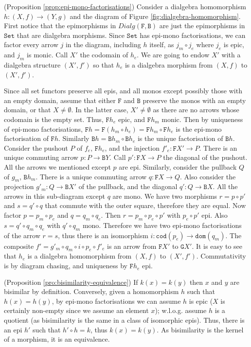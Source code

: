 \documentclass[orivec]{llncs}
\newcommand{\mC}[1]{\mathtt{#1}}
\newcommand{\mF}[1]{\mathtt{#1}}
\newcommand{\Set}{\mC{Set}}
\newcommand{\F}{\mF{F}}
\newcommand{\G}{\mF{G}}
\newcommand{\B}{\mF{B}}
\newcommand{\cod}{\mF{cod}}
\newcommand{\dom}{\mF{dom}}
\newcommand{\dialg}{\mathit{Dialg}}
\newcommand{\proend}{\medskip}
\renewenvironment{proof}{\begin{pro}}{\proend\end{pro}}
\begin{document}
\begin{proof}(Proposition \ref{prop:epi-mono-factorisations})
	Consider a dialgebra homomorphism $h  : (X,f) \to (Y,g)$ and the diagram of Figure \ref{fig:dialgebra-homomorphism}. First notice that the epimorphisms in $\dialg(\F,\B)$ are just the epimorphisms in $\Set$ that are dialgebra morphisms.
	Since $\Set$ has epi-mono factorisations, we can factor every arrow $j$ in the diagram, including $h$ itself, as $j_m \circ j_e$ where $j_e$ is epic, and $j_m$ is monic. Call $X'$ the codomain of $h_e$. We are going to endow $X'$ with a dialgebra structure $(X',f')$ so that $h_e$ is a dialgebra morphism from $(X,f)$ to $(X',f')$. 
	
	Since all set functors preserve all epis, and all monos except possibly those with an empty domain, assume that either $\F$ and $\B$ preserve the monos with an empty domain, or that $X \neq \emptyset$. In the latter case, $X' \neq \emptyset$ as there are no arrows whose codomain is the empty set. Thus, $\F h_e$ epic, and $\F h_m$ monic. Then by uniqueness of epi-mono factorisations, $\F h = \F (h_m \circ h_e) = \F h_m \circ \F h_e$ is the epi-mono factorisation of $\F h$. Similarly $\B h = \B h_m \circ \B h_e$ is the unique factorisation of $\B h$. Consider the pushout $P$ of $f_e$, $\F h_e$, and the injection $f'_e : \F X' \to P$. There is an unique commuting arrow $p : P \to \B Y$. Call $p' : \F X \to P$ the diagonal of the pushout. All the arrows we mentioned except $p$ are epi. Similarly, consider the pullback $Q$ of $g_m$, $\B h_m$. There is a unique commuting arrow $q : \F X \to Q$. Also consider the projection $g'_m : Q \to \B X'$ of the pullback, and the diagonal $q' : Q \to \B X$. All the arrows in 
this sub-diagram except $q$ are mono. We have two morphisms $r = p \circ p'$ and $s = q' \circ q$ that commute with the outer square, therefore they are equal. Now factor $p = p_m \circ p_e$ and $q = q_m \circ q_e$. Then $r = p_m \circ p_e \circ p'$ with $p_e \circ p'$ epi. Also $s = q' \circ q_m \circ q_e$ with $q' \circ q_m$ mono. Therefore we have two epi-mono factorisations  of the arrow $r = s$, thus there is an isomorphism $i : \cod(p_e) \to \dom(q_m)$. The composite $f' = g'_m \circ q_m \circ i \circ p_e \circ f'_e$ is an arrow from $\F X'$ to $\G X'$. It is easy to see that $h_e$ is a dialgebra homomorphism from $(X,f)$ to $(X',f')$. Commutativity is by diagram chasing, and uniqueness by $\F h_e$ epi.
\end{proof}


\begin{proof}(Proposition \ref{pro:bisimilarity-equivalence})
    If $k(x) = k(y)$ then $x$ and $y$ are bisimilar by definition. Conversely, given a homomorphism $h$ such that $h(x) = h(y)$, by epi-mono factorisations we can assume $h$ is epic ($X$ is certainly non-empty since we assume an element $x$); w.l.o.g. assume $h$ is a quotient (as bisimilarity is the same in a class of isomorphic epis). Thus, there is an epi $h'$ such that $h' \circ h = k$, thus $k(x) = k(y)$. As bisimilarity is the kernel of a morphism, it is an equivalence.
\end{proof}
\end{document}
